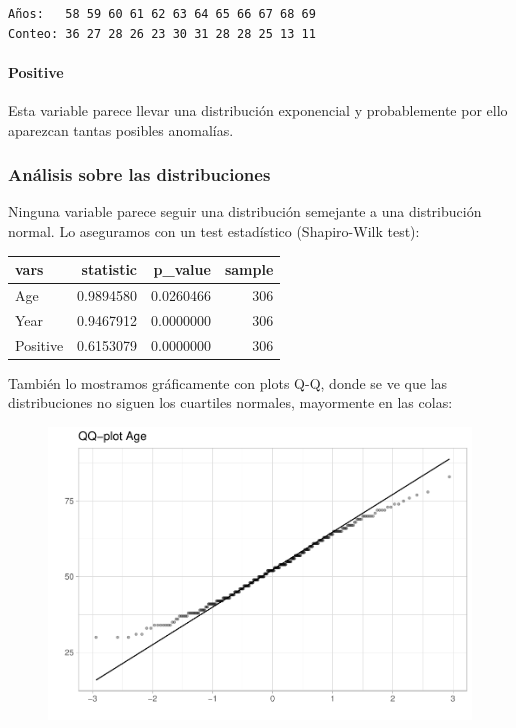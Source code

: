 \begin{verbatim}
Años:   58 59 60 61 62 63 64 65 66 67 68 69 
Conteo: 36 27 28 26 23 30 31 28 28 25 13 11 
\end{verbatim}


\paragraph{Positive}
Esta variable parece llevar una distribución exponencial y probablemente por ello aparezcan tantas posibles anomalías.

\subsubsection{Análisis sobre las distribuciones}

Ninguna variable parece seguir una distribución semejante a una distribución normal. Lo aseguramos con un test estadístico (Shapiro-Wilk test):
\vspace{\baselineskip}

\begin{tabular}{l|r|r|r}
\hline
vars & statistic & p\_value & sample\\
\hline
Age & 0.9894580 & 0.0260466 & 306\\
\hline
Year & 0.9467912 & 0.0000000 & 306\\
\hline
Positive & 0.6153079 & 0.0000000 & 306\\
\hline
\end{tabular}

\vspace{\baselineskip}

También lo mostramos gráficamente con plots Q-Q, donde se ve que las distribuciones no siguen los cuartiles normales, mayormente en las colas:
\begin{figure}[H]\includegraphics[width=.9\linewidth]{img/EDA2_files/figure-latex/unnamed-chunk-18-1} \end{figure}

